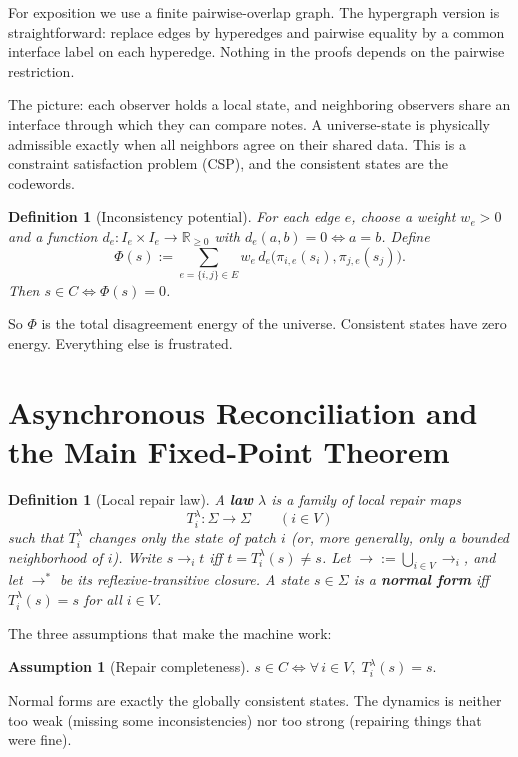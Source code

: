 \documentclass[11pt]{article}
\newtheorem{definition}[theorem]{Definition}
\newtheorem{assumption}[theorem]{Assumption}
\begin{document}
For exposition we use a finite pairwise-overlap graph. The hypergraph version is straightforward: replace edges by hyperedges and pairwise equality by a common interface label on each hyperedge. Nothing in the proofs depends on the pairwise restriction.

The picture: each observer holds a local state, and neighboring observers share an interface through which they can compare notes. A universe-state is physically admissible exactly when all neighbors agree on their shared data. This is a constraint satisfaction problem (CSP), and the consistent states are the codewords.

\begin{definition}[Inconsistency potential]\label{def:potential}
For each edge $e$, choose a weight $w_e>0$ and a function $d_e:I_e\times I_e\to\mathbb{R}_{\ge 0}$ with $d_e(a,b)=0 \iff a=b$. Define
\[
\Phi(s)
:=
\sum_{e=\{i,j\}\in E}
w_e\, d_e\!\bigl(\pi_{i,e}(s_i),\pi_{j,e}(s_j)\bigr).
\]
Then $s\in C \iff \Phi(s)=0$.
\end{definition}

So $\Phi$ is the total disagreement energy of the universe. Consistent states have zero energy. Everything else is frustrated.


\section{Asynchronous Reconciliation and the Main Fixed-Point Theorem}

\begin{definition}[Local repair law]\label{def:repair}
A \textbf{law} $\lambda$ is a family of local repair maps
\[
T_i^\lambda:\Sigma\to\Sigma
\qquad (i\in V)
\]
such that $T_i^\lambda$ changes only the state of patch $i$ (or, more generally, only a bounded neighborhood of $i$). Write $s\to_i t$ iff $t=T_i^\lambda(s)\neq s$. Let $\to := \bigcup_{i\in V}\to_i$, and let $\to^*$ be its reflexive-transitive closure. A state $s\in\Sigma$ is a \textbf{normal form} iff $T_i^\lambda(s)=s$ for all $i\in V$.
\end{definition}

The three assumptions that make the machine work:

\begin{assumption}[Repair completeness]\label{ass:complete}
$s\in C \iff \forall\, i\in V,\; T_i^\lambda(s)=s.$
\end{assumption}

Normal forms are exactly the globally consistent states. The dynamics is neither too weak (missing some inconsistencies) nor too strong (repairing things that were fine).
\end{document}
